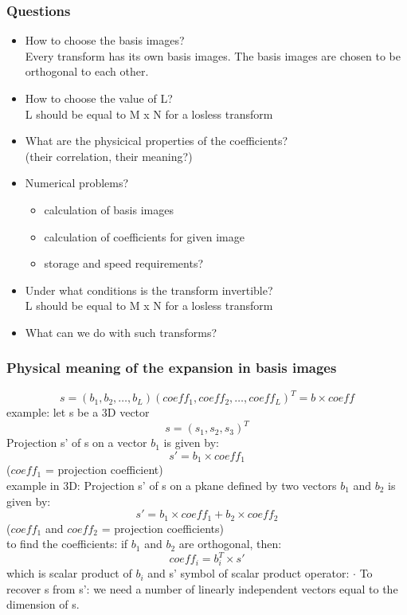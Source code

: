 \documentclass{article}
\begin{document}
\subsubsection{Questions}
\begin{itemize}
    \item How to choose the basis images? \\ Every transform has its own basis images. The basis images are chosen to be orthogonal to each other.
    \item How to choose the value of L? \\ L should be equal to M x N for a losless transform
    \item What are the physicical properties of the coefficients? \\ (their correlation, their meaning?)
    \item Numerical problems? \\ \begin{itemize}
        \item calculation of basis images
        \item calculation of coefficients for given image
        \item storage and speed requirements?
    \end{itemize}
    \item Under what conditions is the transform invertible? \\ L should be equal to M x N for a losless transform
    \item What can we do with such transforms?
\end{itemize}
\subsubsection{Physical meaning of the expansion in basis images}
\begin{equation}
    s = (b_1, b_2, \dots, b_L)(coeff_1, coeff_2, \dots, coeff_L)^T = b \times coeff
\end{equation}
example: let s be a 3D vector \begin{equation}
    s = (s_1, s_2, s_3)^T
\end{equation}
Projection s' of s on a vector $b_1$ is given by: 
\begin{equation}
    s' = b_1 \times coeff_1 
\end{equation}
($coeff_1$ = projection coefficient) \\
example in 3D:
Projection s' of s on a pkane defined by two vectors $b_1$ and $b_2$ is given by:
\begin{equation}
    s' = b_1 \times coeff_1 + b_2 \times coeff_2
\end{equation}
($coeff_1$ and $coeff_2$ = projection coefficients) \\
to find the coefficients:
if $b_1$ and $b_2$ are orthogonal, then:
\begin{equation}
    coeff_i = b_i^T \times s'
\end{equation}
which is scalar product of $b_i$ and s' symbol of scalar product operator: $\cdot$
To recover s from s': we need a number of linearly independent vectors equal to the dimension of s. \\
\end{document}
